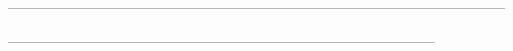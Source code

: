 



-----------------------------------------------------------------------------------------------------------





--------------------------------------------------------------------------------------------


